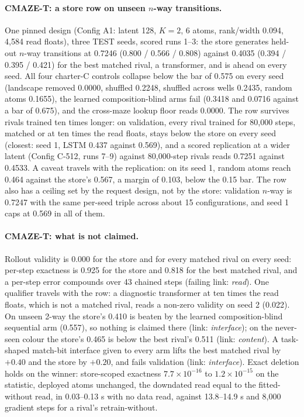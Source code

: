 \documentclass{article} %
\newcommand{\sci}[2]{\ensuremath{#1\times10^{#2}}}
\begin{document}
\paragraph{CMAZE-T: a store row on unseen $n$-way transitions.} One pinned design (Config A1:
latent 128, $K=2$, 6 atoms, rank/width 0.094, 4,584 read floats), three TEST seeds, scored runs
1--3: the store generates held-out $n$-way transitions at 0.7246 (0.800 / 0.566 / 0.808) against
0.4035 (0.394 / 0.395 / 0.421) for the best matched rival, a transformer, and is ahead on every
seed. All four charter-C controls collapse below the bar of 0.575 on every seed (landscape removed
0.0000, shuffled 0.2248, shuffled across wells 0.2435, random atoms 0.1655), the learned
composition-blind arms fail (0.3418 and 0.0716 against a bar of 0.675), and the cross-maze lookup
floor reads 0.0000. The row survives rivals trained ten times longer: on validation, every rival
trained for 80,000 steps, matched or at ten times the read floats, stays below the store on every
seed (closest: seed 1, LSTM 0.437 against 0.569), and a scored replication at a wider latent (Config
C-512, runs 7--9) against 80,000-step rivals reads 0.7251 against 0.4533. A caveat travels with the
replication: on its seed 1, random atoms reach 0.464 against the store's 0.567, a margin of 0.103,
below the 0.15 bar. The row also has a ceiling set by the request design, not by the store:
validation $n$-way is 0.7247 with the same per-seed triple across about 15 configurations, and
seed 1 caps at 0.569 in all of them.

\paragraph{CMAZE-T: what is not claimed.} Rollout validity is 0.000 for the store and for every
matched rival on every seed: per-step exactness is 0.925 for the store and 0.818 for the best
matched rival, and a per-step error compounds over 43 chained steps (failing link: \emph{read}). One
qualifier travels with the row: a diagnostic transformer at ten times the read floats, which is not
a matched rival, reads a non-zero validity on seed 2 (0.022). On unseen 2-way the store's 0.410 is
beaten by the learned composition-blind sequential arm (0.557), so nothing is claimed there (link:
\emph{interface}); on the never-seen colour the store's 0.465 is below the best rival's 0.511 (link:
\emph{content}). A task-shaped match-bit interface given to every arm lifts the best matched rival by
$+0.40$ and the store by $+0.20$, and fails validation (link: \emph{interface}). Exact deletion holds
on the winner: store-scoped exactness \sci{7.7}{-16} to \sci{1.2}{-15} on the statistic, deployed
atoms unchanged, the downdated read equal to the fitted-without read, in 0.03--0.13 s with no data
read, against 13.8--14.9 s and 8,000 gradient steps for a rival's retrain-without.
\end{document}
